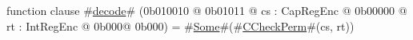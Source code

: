 function clause #\hyperref[zdecode]{decode}# (0b010010 @ 0b01011 @ cs : CapRegEnc @ 0b00000 @ rt : IntRegEnc @ 0b000@ 0b000) = #\hyperref[zSome]{Some}#(#\hyperref[zCCheckPerm]{CCheckPerm}#(cs, rt))
